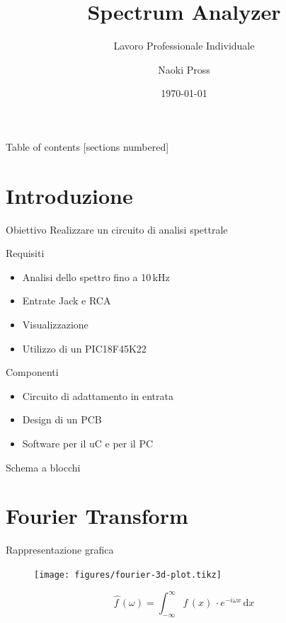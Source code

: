 \documentclass[10pt, xetex, handout]{beamer}
\title{Spectrum Analyzer}
\subtitle{Lavoro Professionale Individuale}
\date{\today}
\author{Naoki Pross}
\institute{SAM Bellinzona}
\newcommand{\dd}[1]{\mathrm{d}#1}
\begin{document}
\maketitle

\begin{frame}{Table of contents}
    [sections numbered]
    \tableofcontents[hideallsubsections]
\end{frame}

\section{Introduzione}
\begin{frame}{Obiettivo}
    Realizzare un circuito di analisi spettrale
    \begin{block}{Requisiti}
    \begin{itemize}
        \item Analisi dello spettro fino a 10\,kHz
        \item Entrate Jack e RCA
        \item Visualizzazione 
        \item Utilizzo di un PIC18F45K22
    \end{itemize}
    \end{block}
    
    \pause
    \begin{block}{Componenti}
    \begin{itemize}
        \item Circuito di adattamento in entrata
        \item Design di un PCB
        \item Software per il uC e per il PC
    \end{itemize}
    \end{block}
\end{frame}

\begin{frame}{Schema a blocchi}
    \begin{figure} \centering
    \end{figure}
\end{frame}

\section{Fourier Transform}
\begin{frame}{Rappresentazione grafica}
    \begin{figure} \centering
        \texttt{[image: figures/fourier-3d-plot.tikz]}
    \end{figure}
    \[
        \hat{f\,} (\omega) 
        = \int_{-\infty}^\infty f\,(x)\,\cdot e^{-i\omega x}\,\dd{x}
    \]
\end{frame}
\end{document}
